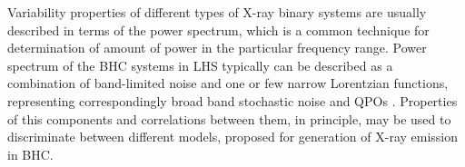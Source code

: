 \documentclass[a4paper,fleqn,usenatbib]{mnras}
\begin{document}
%
%
%

Variability properties of different types of X-ray binary systems are usually described in terms of the power spectrum, which is a common technique for determination of amount of power in the particular frequency range. 
Power spectrum of the BHC systems in LHS typically can be described as a combination of band-limited noise and one or few narrow Lorentzian functions, representing correspondingly broad band stochastic noise and QPOs \citep[see, e.g.][e.t.c]{1972ApJ...174L..35T, 1990A&A...227L..33B, homan05}. 
Properties of this components and correlations between them, in principle, may be used to discriminate between different models, proposed for generation of X-ray emission in BHC. 
 
\end{document}
